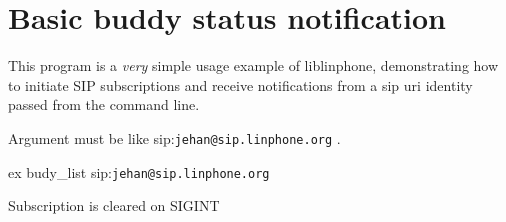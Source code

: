 \section{Basic buddy status notification}
\label{group__buddy__tutorials}
This program is a {\itshape very} simple usage example of liblinphone, demonstrating how to initiate S\-I\-P subscriptions and receive notifications from a sip uri identity passed from the command line. \par
Argument must be like sip\-:{\tt jehan@sip.\-linphone.\-org} . \par
 ex budy\-\_\-list sip\-:{\tt jehan@sip.\-linphone.\-org} \par
Subscription is cleared on S\-I\-G\-I\-N\-T \par
 
